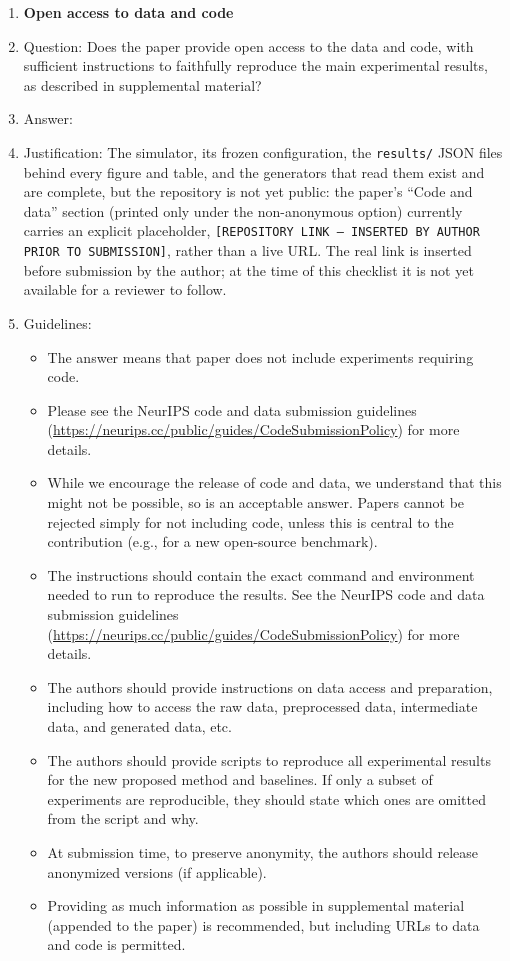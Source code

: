 \begin{enumerate}
\item {\bf Open access to data and code}
    \item[] Question: Does the paper provide open access to the data and code, with sufficient instructions to faithfully reproduce the main experimental results, as described in supplemental material?
    \item[] Answer: \answerNo{}
    \item[] Justification: The simulator, its frozen configuration, the \texttt{results/} JSON files behind every figure and table, and the generators that read them exist and are complete, but the repository is not yet public: the paper's ``Code and data'' section (printed only under the non-anonymous option) currently carries an explicit placeholder, \texttt{[REPOSITORY LINK -- INSERTED BY AUTHOR PRIOR TO SUBMISSION]}, rather than a live URL. The real link is inserted before submission by the author; at the time of this checklist it is not yet available for a reviewer to follow.
    \item[] Guidelines:
    \begin{itemize}
        \item The answer \answerNA{} means that paper does not include experiments requiring code.
        \item Please see the NeurIPS code and data submission guidelines (\url{https://neurips.cc/public/guides/CodeSubmissionPolicy}) for more details.
        \item While we encourage the release of code and data, we understand that this might not be possible, so \answerNo{} is an acceptable answer. Papers cannot be rejected simply for not including code, unless this is central to the contribution (e.g., for a new open-source benchmark).
        \item The instructions should contain the exact command and environment needed to run to reproduce the results. See the NeurIPS code and data submission guidelines (\url{https://neurips.cc/public/guides/CodeSubmissionPolicy}) for more details.
        \item The authors should provide instructions on data access and preparation, including how to access the raw data, preprocessed data, intermediate data, and generated data, etc.
        \item The authors should provide scripts to reproduce all experimental results for the new proposed method and baselines. If only a subset of experiments are reproducible, they should state which ones are omitted from the script and why.
        \item At submission time, to preserve anonymity, the authors should release anonymized versions (if applicable).
        \item Providing as much information as possible in supplemental material (appended to the paper) is recommended, but including URLs to data and code is permitted.
    \end{itemize}



\end{enumerate}
